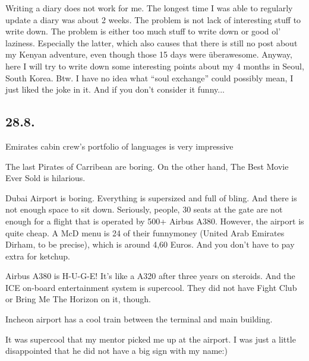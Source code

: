 \begin{post}
	\begin{content}
Writing a diary does not work for me. The longest time I was able to regularly update a diary was about 2 weeks. The problem is not lack of interesting stuff to write down. The problem is either too much stuff to write down or good ol' laziness. Especially the latter, which also causes that there is still no post about my Kenyan adventure, even though those 15 days were überawesome. Anyway, here I will try to write down some interesting points about my 4 months in Seoul, South Korea. Btw. I have no idea what ``soul exchange'' could possibly mean, I just liked the joke in it. And if you don't consider it funny...

\subsection{28.8.}

\begin{itemize*}

	\item Emirates cabin crew's portfolio of languages is very impressive

	\item The last Pirates of Carribean are boring. On the other hand, The Best Movie Ever Sold is hilarious.

	\item Dubai Airport is boring. Everything is supersized and full of bling. And there is not enough space to sit down. Seriously, people, 30 seats at the gate are not enough for a flight that is operated by 500+ Airbus A380. However, the airport is quite cheap. A McD menu is 24 of their funnymoney (United Arab Emirates Dirham, to be precise), which is around 4,60 Euros. And you don't have to pay extra for ketchup.

	\item Airbus A380 is H-U-G-E! It's like a A320 after three years on steroids. And the ICE on-board entertainment system is supercool. They did not have Fight Club or Bring Me The Horizon on it, though.

	\item Incheon airport has a cool train between the terminal and main building.

	\item It was supercool that my mentor picked me up at the airport. I was just a little disappointed that he did not have a big sign with my name:)


\end{itemize*}
\end{content}
\end{post}
